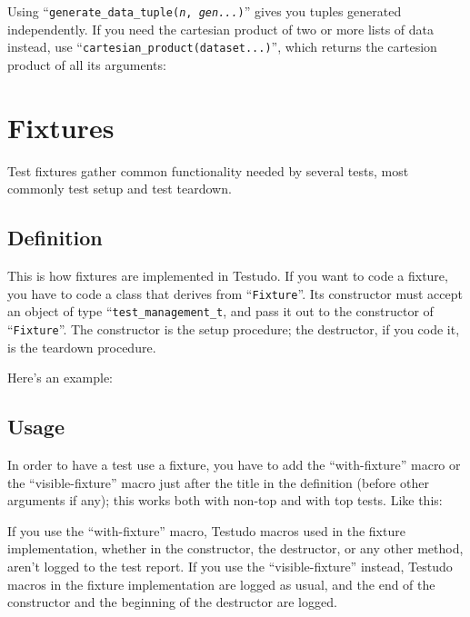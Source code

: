 \documentclass[twoside, a4paper, article]{memoir}
\providecommand\typesetexample[1]{%
}
\begin{document}
\typesetexample{data-for-with-data-generate-data-tuple}

Using ``\texttt{generate\_data\_tuple(\textit{n}, \textit{gen...})}'' gives you
tuples generated independently.  If you need the cartesian product of two or
more lists of data instead, use ``\texttt{cartesian\_product(dataset...)}'',
which returns the cartesion product of all its arguments:

\typesetexample{data-for-with-data-cartesian-product}


\chapter{Fixtures}
\label{cha:fixtures}

Test fixtures gather common functionality needed by several tests, most
commonly test setup and test teardown.

\section{Definition}
\label{sec:fixture-definition}

This is how fixtures are implemented in Testudo.  If you want to code a
fixture, you have to code a class that derives from
``\texttt{Fixture}''.  Its constructor must accept an object of type
``\texttt{test\_management\_t}, and pass it out to the constructor of
``\texttt{Fixture}''.  The constructor is the setup procedure; the
destructor, if you code it, is the teardown procedure.

Here's an example:

\typesetexample{fixture-outatime-definition}

\section{Usage}
\label{sec:fixture-usage}

In order to have a test use a fixture, you have to add the ``with-fixture''
macro or the ``visible-fixture'' macro just after the title in the definition
(before other arguments if any); this works both with non-top and with top
tests.  Like this:

\typesetexample{fixture-outatime-test}

If you use the ``with-fixture'' macro, Testudo macros used in the fixture
implementation, whether in the constructor, the destructor, or any other
method, aren't logged to the test report.  If you use the ``visible-fixture''
instead, Testudo macros in the fixture implementation are logged as usual, and
the end of the constructor and the beginning of the destructor are logged.
\end{document}
